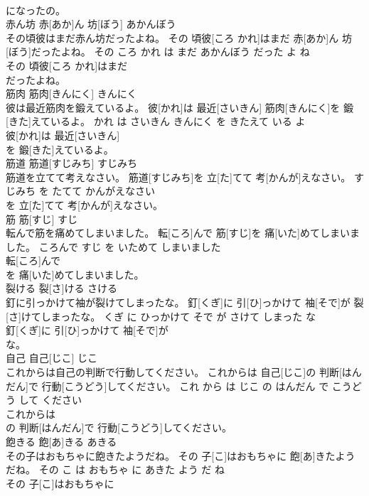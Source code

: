 \documentclass[8pt]{extreport}
\begin{document}
\begin{CJK}{UTF8}{min}
\\	になったの。			
\\	赤ん坊	赤[あか]ん 坊[ぼう]	あかんぼう	
\\	その頃彼はまだ赤ん坊だったよね。	その 頃彼[ころ かれ]はまだ 赤[あか]ん 坊[ぼう]だったよね。	その ころ かれ は まだ あかんぼう だった よ ね	
\\	その 頃彼[ころ かれ]はまだ
\\	だったよね。			
\\	筋肉	筋肉[きんにく]	きんにく	
\\	彼は最近筋肉を鍛えているよ。	彼[かれ]は 最近[さいきん] 筋肉[きんにく]を 鍛[きた]えているよ。	かれ は さいきん きんにく を きたえて いる よ	
\\	彼[かれ]は 最近[さいきん]
\\	を 鍛[きた]えているよ。			
\\	筋道	筋道[すじみち]	すじみち	
\\	筋道を立てて考えなさい。	筋道[すじみち]を 立[た]てて 考[かんが]えなさい。	すじみち を たてて かんがえなさい	
\\	を 立[た]てて 考[かんが]えなさい。			
\\	筋	筋[すじ]	すじ	
\\	転んで筋を痛めてしまいました。	転[ころ]んで 筋[すじ]を 痛[いた]めてしまいました。	ころんで すじ を いためて しまいました	
\\	転[ころ]んで
\\	を 痛[いた]めてしまいました。			
\\	裂ける	裂[さ]ける	さける	
\\	釘に引っかけて袖が裂けてしまったな。	釘[くぎ]に 引[ひ]っかけて 袖[そで]が 裂[さ]けてしまったな。	くぎ に ひっかけて そで が さけて しまった な	
\\	釘[くぎ]に 引[ひ]っかけて 袖[そで]が
\\	な。			
\\	自己	自己[じこ]	じこ	
\\	これからは自己の判断で行動してください。	これからは 自己[じこ]の 判断[はんだん]で 行動[こうどう]してください。	これ から は じこ の はんだん で こうどう して ください	
\\	これからは
\\	の 判断[はんだん]で 行動[こうどう]してください。			
\\	飽きる	飽[あ]きる	あきる	
\\	その子はおもちゃに飽きたようだね。	その 子[こ]はおもちゃに 飽[あ]きたようだね。	その こ は おもちゃ に あきた よう だ ね	
\\	その 子[こ]はおもちゃに

\end{CJK}
\end{document}
